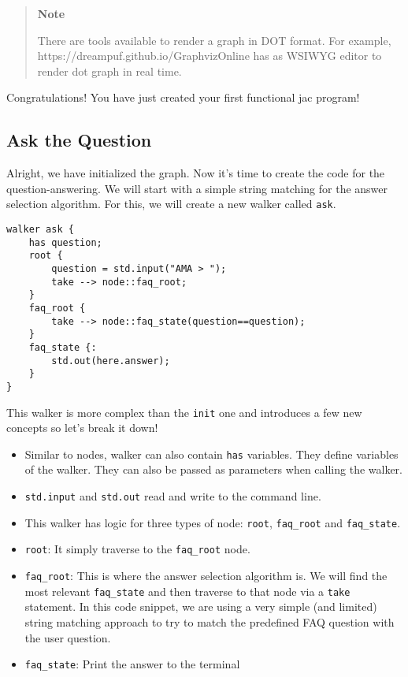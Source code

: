 \begin{quote}
\textbf{Note}

There are tools available to render a graph in DOT format. For example,
https://dreampuf.github.io/GraphvizOnline has as WSIWYG editor to render
dot graph in real time.
\end{quote}

Congratulations! You have just created your first functional jac
program!

\subsection{Ask the Question}\label{ask-the-question}

Alright, we have initialized the graph. Now it's time to create the code
for the question-answering. We will start with a simple string matching
for the answer selection algorithm. For this, we will create a new
walker called \lstinline!ask!.

\begin{lstlisting}
walker ask {
    has question;
    root {
        question = std.input("AMA > ");
        take --> node::faq_root;
    }
    faq_root {
        take --> node::faq_state(question==question);
    }
    faq_state {:
        std.out(here.answer);
    }
}
\end{lstlisting}

This walker is more complex than the \lstinline!init! one and introduces
a few new concepts so let's break it down!

\begin{itemize}
\tightlist
\item
  Similar to nodes, walker can also contain \lstinline!has! variables.
  They define variables of the walker. They can also be passed as
  parameters when calling the walker.
\item
  \lstinline!std.input! and \lstinline!std.out! read and write to the
  command line.
\item
  This walker has logic for three types of node: \lstinline!root!,
  \lstinline!faq_root! and \lstinline!faq_state!.
\item
  \lstinline!root!: It simply traverse to the \lstinline!faq_root! node.
\item
  \lstinline!faq_root!: This is where the answer selection algorithm is.
  We will find the most relevant \lstinline!faq_state! and then traverse
  to that node via a \lstinline!take! statement. In this code snippet,
  we are using a very simple (and limited) string matching approach to
  try to match the predefined FAQ question with the user question.
\item
  \lstinline!faq_state!: Print the answer to the terminal
\end{itemize}


